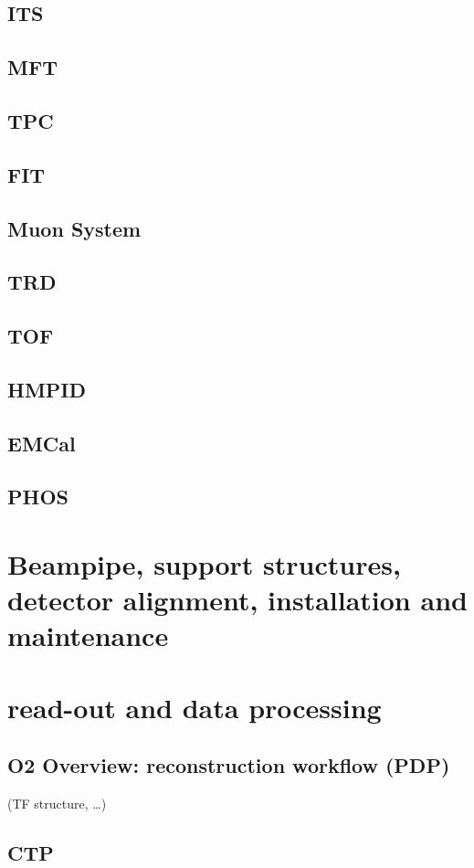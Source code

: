 \documentclass[ALICE,manyauthors]{cernphprep}
\begin{document}
\subsection{ITS}
\subsection{MFT}
\subsection{TPC}
\subsection{FIT}
\subsection{Muon System}
\subsection{TRD}
\subsection{TOF}
\subsection{HMPID}
\subsection{EMCal}
\subsection{PHOS}

\section{Beampipe, support structures, detector alignment, installation and maintenance}

\section{read-out and data processing}
\subsection{O2 Overview: reconstruction workflow (PDP)}
(TF structure, …)
\subsection{CTP}
\end{document}
